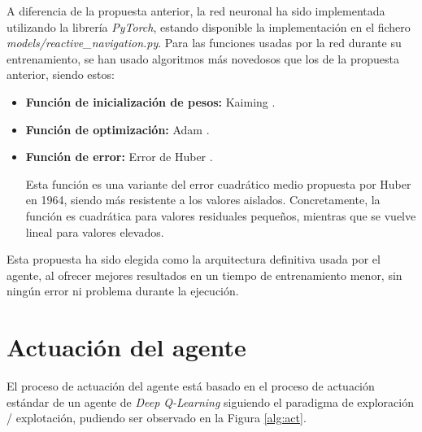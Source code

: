 A diferencia de la propuesta anterior, la red neuronal ha sido implementada utilizando la librería \textit{PyTorch}, estando disponible la implementación en el fichero \textit{models/reactive{\_}navigation.py}. Para las funciones usadas por la red durante su entrenamiento, se han usado algoritmos más novedosos que los de la propuesta anterior, siendo estos:

\begin{itemize}
	\item \textbf{Función de inicialización de pesos:} Kaiming \cite{DBLP:journals/corr/HeZR015}.
	\item \textbf{Función de optimización:} Adam \cite{adam2014}.
	\item \textbf{Función de error:} Error de Huber \cite{10.1214/aoms/1177703732}. 
	
	Esta función es una variante del error cuadrático medio propuesta por Huber en 1964, siendo más resistente a los valores aislados. Concretamente, la función es cuadrática para valores residuales pequeños, mientras que se vuelve lineal para valores elevados.
\end{itemize}

Esta propuesta ha sido elegida como la arquitectura definitiva usada por el agente, al ofrecer mejores resultados en un tiempo de entrenamiento menor, sin ningún error ni problema durante la ejecución.

\section{Actuación del agente}

El proceso de actuación del agente está basado en el proceso de actuación estándar de un agente de \textit{Deep Q-Learning} siguiendo el paradigma de exploración / explotación, pudiendo ser observado en la Figura \ref{alg:act}.

